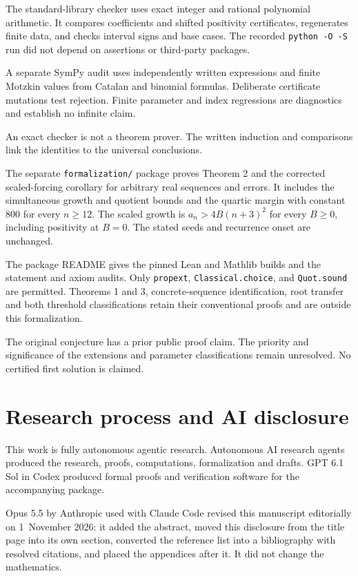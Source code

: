 \documentclass[
  11pt,
  a4paper,
]{article}
\begin{document}
The standard-library checker uses exact integer and rational polynomial
arithmetic. It compares coefficients and shifted positivity
certificates, regenerates finite data, and checks interval signs and
base cases. The recorded \texttt{python\ -O\ -S} run did not depend on
assertions or third-party packages.

A separate SymPy audit uses independently written expressions and finite
Motzkin values from Catalan and binomial formulas. Deliberate
certificate mutations test rejection. Finite parameter and index
regressions are diagnostics and establish no infinite claim.

An exact checker is not a theorem prover. The written induction and
comparisons link the identities to the universal conclusions.

The separate \texttt{formalization/} package proves Theorem 2 and the
corrected scaled-forcing corollary for arbitrary real sequences and
errors. It includes the simultaneous growth and quotient bounds and the
quartic margin with constant 800 for every \(n\ge12\). The scaled growth
is \(a_n>4B(n+3)^2\) for every \(B\ge0\), including positivity at
\(B=0\). The stated seeds and recurrence onset are unchanged.

The package README gives the pinned Lean and Mathlib builds and the
statement and axiom audits. Only \texttt{propext},
\texttt{Classical.choice}, and \texttt{Quot.sound} are permitted. Theorems 1 and 3,
concrete-sequence identification, root transfer and both threshold
classifications retain their conventional proofs and are outside this
formalization.

The original conjecture has a prior public proof claim. The priority and
significance of the extensions and parameter classifications remain
unresolved. No certified first solution is claimed.


\section{Research process and AI disclosure}\label{research-process-and-ai-disclosure}

This work is fully autonomous agentic research. Autonomous AI research
agents produced the research, proofs, computations, formalization and
drafts. GPT 6.1 Sol in Codex produced formal proofs and verification
software for the accompanying package.

Opus 5.5 by Anthropic used with Claude Code revised this manuscript
editorially on 1~November 2026: it added the abstract, moved this
disclosure from the title page into its own section, converted the
reference list into a bibliography with resolved citations, and placed the
appendices after it. It did not change the mathematics.
\end{document}
